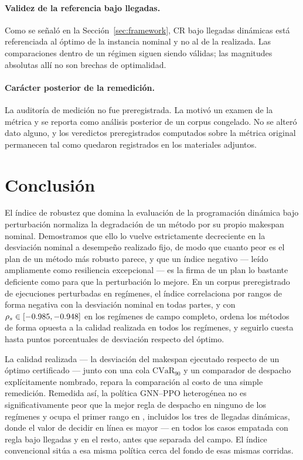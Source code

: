 \documentclass[a4paper,fleqn]{cas-sc}
\newcommand{\RQ}{\mathrm{CR}}
\newcommand{\CVaR}{\mathrm{CVaR}}
\begin{document}
\paragraph{Validez de la referencia bajo llegadas.} Como se señaló en la
Sección~\ref{sec:framework}, $\RQ$ bajo llegadas dinámicas está referenciada al
óptimo de la instancia nominal y no al de la realizada. Las comparaciones dentro
de un régimen siguen siendo válidas; las magnitudes absolutas allí no son
brechas de optimalidad.

\paragraph{Carácter posterior de la remedición.} La auditoría de medición no fue
preregistrada. La motivó un examen de la métrica y se reporta como análisis
posterior de un corpus congelado. No se alteró dato alguno, y los veredictos
preregistrados computados sobre la métrica original permanecen tal como quedaron
registrados en los materiales adjuntos.

\section{Conclusión}\label{sec:conclusion}

El índice de robustez que domina la evaluación de la programación dinámica bajo
perturbación normaliza la degradación de un método por su propio makespan
nominal. Demostramos que ello lo vuelve estrictamente decreciente en la
desviación nominal a desempeño realizado fijo, de modo que cuanto peor es el
plan de un método más robusto parece, y que un índice negativo --- leído
ampliamente como resiliencia excepcional --- es la firma de un plan lo bastante
deficiente como para que la perturbación lo mejore. En un corpus preregistrado
de \NRunsDisrupted{} ejecuciones perturbadas en \NRegimes{} regímenes, el índice
correlaciona por rangos de forma negativa con la desviación nominal en todas
partes, y con $\rho_s\in[-0.985{},-0.948{}]$ en los \NConfRegimes{}
regímenes de campo completo, ordena los métodos de forma opuesta a la calidad
realizada en todos los regímenes, y seguirlo cuesta hasta \PenaltyMax{} puntos
porcentuales de desviación respecto del óptimo.

La calidad realizada --- la desviación del makespan ejecutado respecto de un
óptimo certificado --- junto con una cola $\CVaR_{90}$ y un comparador de
despacho explícitamente nombrado, repara la comparación al costo de una simple
remedición. Remedida así, la política GNN--PPO heterogénea no es
significativamente peor que la mejor regla de despacho en ninguno de los
\NRegimes{} regímenes y ocupa el primer rango en \NRLBest{}, incluidos los tres
de llegadas dinámicas, donde el valor de decidir en línea es mayor --- en todos
los casos empatada con \CliqueArr{} regla bajo llegadas y \CliqueOther{} en el
resto, antes que separada del campo. El índice
convencional sitúa a esa misma política cerca del fondo de esas mismas corridas.
\end{document}
